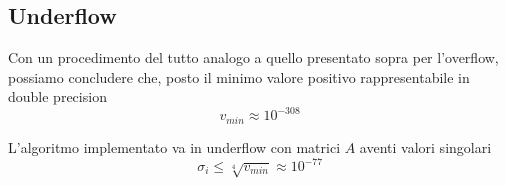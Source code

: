 \subsection{Underflow}
Con un procedimento del tutto analogo a quello presentato sopra per l'overflow, 
possiamo concludere che, posto il minimo valore positivo rappresentabile in 
double 
precision
\begin{equation*}
	v_{min} \approx 10^{-308}
\end{equation*}

L'algoritmo implementato va in underflow con matrici $A$ aventi valori singolari
\begin{equation*}
	\sigma_i \leq \sqrt[4]{v_{min}} \approx 10^{-77}
\end{equation*}

